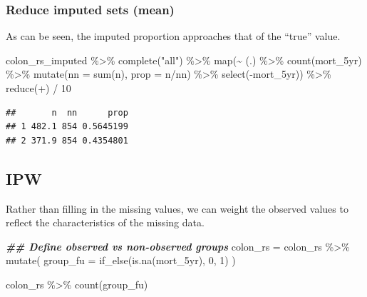 \documentclass[
]{book}
\newenvironment{Shaded}{\begin{snugshade}}{\end{snugshade}}
\newcommand{\AttributeTok}[1]{\textcolor[rgb]{0.77,0.63,0.00}{#1}}
\newcommand{\DecValTok}[1]{\textcolor[rgb]{0.00,0.00,0.81}{#1}}
\newcommand{\DocumentationTok}[1]{\textcolor[rgb]{0.56,0.35,0.01}{\textbf{\textit{#1}}}}
\newcommand{\FunctionTok}[1]{\textcolor[rgb]{0.00,0.00,0.00}{#1}}
\newcommand{\NormalTok}[1]{#1}
\newcommand{\OtherTok}[1]{\textcolor[rgb]{0.56,0.35,0.01}{#1}}
\newcommand{\SpecialCharTok}[1]{\textcolor[rgb]{0.00,0.00,0.00}{#1}}
\newcommand{\StringTok}[1]{\textcolor[rgb]{0.31,0.60,0.02}{#1}}
\begin{document}
\hypertarget{reduce-imputed-sets-mean}{%
\subsubsection{Reduce imputed sets (mean)}\label{reduce-imputed-sets-mean}}

As can be seen, the imputed proportion approaches that of the ``true'' value.

\begin{Shaded}
\begin{Highlighting}[]
\NormalTok{colon\_rs\_imputed }\SpecialCharTok{\%\textgreater{}\%} 
  \FunctionTok{complete}\NormalTok{(}\StringTok{"all"}\NormalTok{) }\SpecialCharTok{\%\textgreater{}\%} 
  \FunctionTok{map}\NormalTok{(}\SpecialCharTok{\textasciitilde{}}\NormalTok{ (.) }\SpecialCharTok{\%\textgreater{}\%} \FunctionTok{count}\NormalTok{(mort\_5yr) }\SpecialCharTok{\%\textgreater{}\%} 
        \FunctionTok{mutate}\NormalTok{(}\AttributeTok{nn =} \FunctionTok{sum}\NormalTok{(n),}
               \AttributeTok{prop =}\NormalTok{ n}\SpecialCharTok{/}\NormalTok{nn) }\SpecialCharTok{\%\textgreater{}\%} 
        \FunctionTok{select}\NormalTok{(}\SpecialCharTok{{-}}\NormalTok{mort\_5yr)) }\SpecialCharTok{\%\textgreater{}\%} 
  \FunctionTok{reduce}\NormalTok{(}\StringTok{\textasciigrave{}}\AttributeTok{+}\StringTok{\textasciigrave{}}\NormalTok{) }\SpecialCharTok{/} \DecValTok{10}
\end{Highlighting}
\end{Shaded}

\begin{verbatim}
##       n  nn      prop
## 1 482.1 854 0.5645199
## 2 371.9 854 0.4354801
\end{verbatim}

\hypertarget{ipw}{%
\subsection{IPW}\label{ipw}}

Rather than filling in the missing values, we can weight the observed values to reflect the characteristics of the missing data.

\begin{Shaded}
\begin{Highlighting}[]
\DocumentationTok{\#\# Define observed vs non{-}observed groups}
\NormalTok{colon\_rs }\OtherTok{=}\NormalTok{ colon\_rs }\SpecialCharTok{\%\textgreater{}\%} 
  \FunctionTok{mutate}\NormalTok{(}
    \AttributeTok{group\_fu =} \FunctionTok{if\_else}\NormalTok{(}\FunctionTok{is.na}\NormalTok{(mort\_5yr), }\DecValTok{0}\NormalTok{, }\DecValTok{1}\NormalTok{)}
\NormalTok{  )}

\NormalTok{colon\_rs }\SpecialCharTok{\%\textgreater{}\%} 
  \FunctionTok{count}\NormalTok{(group\_fu)}
\end{Highlighting}
\end{Shaded}
\end{document}
